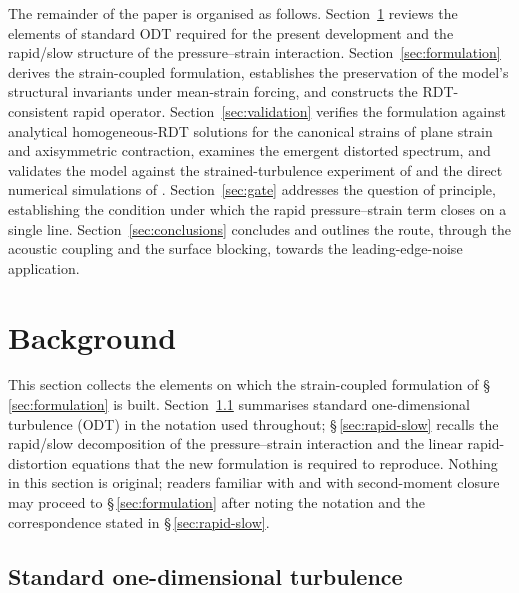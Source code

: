 \documentclass[lineno]{JFM-FLM_Au}
\begin{document}
The remainder of the paper is organised as follows.
Section~\ref{sec:odt} reviews the elements of standard ODT required for the
present development and the rapid/slow structure of the pressure--strain
interaction. Section~\ref{sec:formulation} derives the strain-coupled
formulation, establishes the preservation of the model's structural
invariants under mean-strain forcing, and constructs the RDT-consistent
rapid operator. Section~\ref{sec:validation} verifies the formulation
against analytical homogeneous-RDT solutions for the canonical strains
of plane strain and axisymmetric contraction, examines the emergent
distorted spectrum, and validates the model against the strained-turbulence
experiment of \citet{ChenMeneveauKatz2006} and the direct numerical
simulations of \citet{LeeReynolds1985}. Section~\ref{sec:gate} addresses the
question of principle, establishing the condition under which the rapid
pressure--strain term closes on a single line.
Section~\ref{sec:conclusions} concludes and outlines the route, through the
acoustic coupling and the surface blocking, towards the leading-edge-noise
application.


\section{Background}\label{sec:odt}

This section collects the elements on which the strain-coupled formulation
of \S\,\ref{sec:formulation} is built. Section~\ref{sec:odt-standard}
summarises standard one-dimensional turbulence (ODT) in the notation used
throughout; \S\,\ref{sec:rapid-slow} recalls the rapid/slow decomposition
of the pressure--strain interaction and the linear rapid-distortion
equations that the new formulation is required to reproduce. Nothing in
this section is original; readers familiar with
\citet{Kerstein1999,Kerstein2001} and with second-moment closure
\citep{Pope2000} may proceed to \S\,\ref{sec:formulation} after noting the
notation and the correspondence stated in \S\,\ref{sec:rapid-slow}.

\subsection{Standard one-dimensional turbulence}\label{sec:odt-standard}
\end{document}
